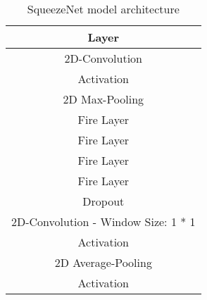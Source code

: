 \begin{table}[]
    \centering
    \begin{tabular}{|c|}
        \hline \textbf{Layer} \\\hline
        \hline 2D-Convolution \\\hline
        Activation  \\\hline
        2D Max-Pooling \\\hline
        Fire Layer  \\\hline
        Fire Layer \\\hline
        Fire Layer  \\\hline
        Fire Layer  \\\hline
        Dropout \\\hline
        2D-Convolution - Window Size: 1 * 1 \\\hline
        Activation\\\hline
        2D Average-Pooling \\\hline
        Activation \\\hline
    \end{tabular}
    \caption{SqueezeNet model architecture \cite{squeezent_paper}}
    \label{tab:optimized_squeezenet}
\end{table}

